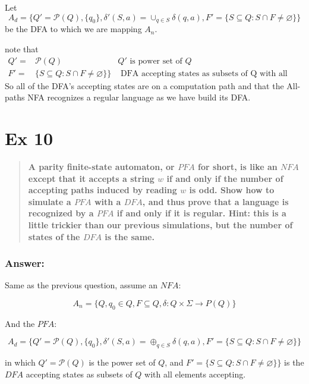 \documentclass[titlepage]{article}\usepackage[]{graphicx}\usepackage[]{color}
\begin{document}
Let \[ A_d = \{Q' = \mathcal{P}(Q), \{ q_0 \}, \delta'(S,a) = \cup_{q \in S}
\delta(q,a), F' = \{ S \subseteq Q : S \cap F \neq \varnothing \} \} \]
be the DFA to which we are mapping $A_n$.

note that
\begin{align*}
  Q' =& \mathcal{P}(Q)& Q' \text{ is power set of } Q \\ 
  F' =& \{ S \subseteq Q : S \cap F \neq \varnothing \} \} &\text{ DFA accepting states
  as subsets of Q with all elements accepting } 
\end{align*}
So all of the DFA's accepting states are on a computation path and that the
All-paths NFA recognizes a regular language as we have build its DFA.




\section*{Ex 10}
\begin{quote}
  \textbf{ A parity finite-state automaton, or $PFA$ for short, is like an
    $NFA$ except that it accepts a string $w$ if and only if the number of
    accepting paths induced by reading $w$ is odd. Show how to simulate a $PFA$
    with a $DFA$, and thus prove that a language is recognized by a $PFA$ if
    and only if it is regular. Hint: this is a little trickier than our
  previous simulations, but the number of states of the $DFA$ is the same.}
\end{quote}

\subsubsection*{Answer:}
Same as the previous question, assume an $NFA$:

\[ A_n = \{ Q, q_0 \in Q, F \subseteq Q, \delta : Q \times \Sigma \to P(Q) \} \]

And the $PFA$:

\[ A_d = \{Q' = \mathcal{P}(Q), \{ q_0 \}, \delta'(S,a) = \oplus_{q \in S}
\delta(q,a), F' = \{ S \subseteq Q : S \cap F \neq \varnothing \} \} \]

in which $Q' = \mathcal{P}(Q)$ is the power set of $Q$, and $F' = \{ S \subseteq Q : S \cap F \neq \varnothing \} \}$ is the $DFA$ accepting states as subsets of $Q$ with all elements accepting.
\end{document}
